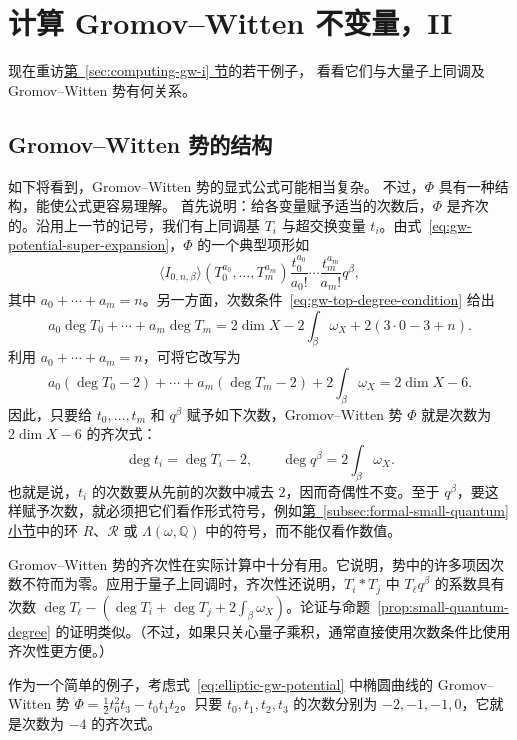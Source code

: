 \section{计算 Gromov--Witten 不变量，II}\label{sec:computing-gw-ii}
现在重访\hyperref[sec:computing-gw-i]{第~\ref*{sec:computing-gw-i} 节}的若干例子，
看看它们与大量子上同调及 Gromov--Witten 势有何关系。
\subsection{Gromov--Witten 势的结构}\label{subsec:gw-potential-structure}
如下将看到，Gromov--Witten 势的显式公式可能相当复杂。
不过，$\Phi$ 具有一种结构，能使公式更容易理解。
首先说明：给各变量赋予适当的次数后，$\Phi$ 是齐次的。沿用上一节的记号，我们有上同调基 $T_i$ 与超交换变量 $t_i$。由式~\eqref{eq:gw-potential-super-expansion}，$\Phi$ 的一个典型项形如
\[
\langle I_{0,n,\beta}\rangle(T_0^{a_0},\ldots,T_m^{a_m})
\frac{t_0^{a_0}}{a_0!}\cdots\frac{t_m^{a_m}}{a_m!}q^\beta,
\]
其中 $a_0+\cdots+a_m=n$。另一方面，次数条件~\eqref{eq:gw-top-degree-condition} 给出
\[
a_0\deg T_0+\cdots+a_m\deg T_m
=2\dim X-2\int_\beta\omega_X+2(3\cdot0-3+n).
\]
利用 $a_0+\cdots+a_m=n$，可将它改写为
\[
a_0(\deg T_0-2)+\cdots+a_m(\deg T_m-2)+2\int_\beta\omega_X=2\dim X-6.
\]
因此，只要给 $t_0,\ldots,t_m$ 和 $q^\beta$ 赋予如下次数，Gromov--Witten 势 $\Phi$ 就是次数为 $2\dim X-6$ 的齐次式：
\begin{equation}\label{eq:gw-potential-grading}
\deg t_i=\deg T_i-2,\qquad \deg q^\beta=2\int_\beta\omega_X.
\end{equation}
也就是说，$t_i$ 的次数要从先前的次数中减去 $2$，因而奇偶性不变。至于 $q^\beta$，要这样赋予次数，就必须把它们看作形式符号，例如\hyperref[subsec:formal-small-quantum]{第~\ref*{subsec:formal-small-quantum} 小节}中的环 $R$、$\mathcal R$ 或 $\Lambda(\omega,\mathbb Q)$ 中的符号，而不能仅看作数值。

Gromov--Witten 势的齐次性在实际计算中十分有用。它说明，势中的许多项因次数不符而为零。应用于量子上同调时，齐次性还说明，$T_i*T_j$ 中 $T_\ell q^\beta$ 的系数具有次数 $\deg T_\ell-(\deg T_i+\deg T_j+2\int_\beta\omega_X)$。论证与命题~\ref{prop:small-quantum-degree} 的证明类似。（不过，如果只关心量子乘积，通常直接使用次数条件比使用齐次性更方便。）

作为一个简单的例子，考虑式~\eqref{eq:elliptic-gw-potential} 中椭圆曲线的 Gromov--Witten 势 $\Phi=\tfrac12t_0^2t_3-t_0t_1t_2$。只要 $t_0,t_1,t_2,t_3$ 的次数分别为 $-2,-1,-1,0$，它就是次数为 $-4$ 的齐次式。

